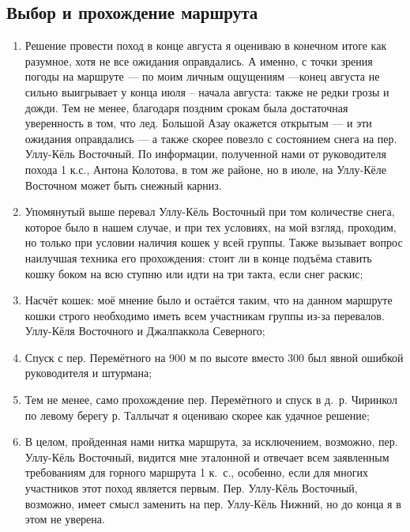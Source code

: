 \subsection{Выбор и прохождение маршрута}  
	\begin{enumerate}
		\item Решение провести поход в конце августа я оцениваю в конечном итоге как разумное, хотя не все ожидания оправдались. А именно, с точки зрения погоды на маршруте --- по моим личным ощущениям ---конец августа не сильно выигрывает у конца июля -- начала августа: также не редки грозы и дожди. Тем не менее, благодаря поздним срокам была достаточная уверенность в том, что лед. Большой Азау окажется открытым --- и эти ожидания оправдались --- а также скорее повезло с состоянием снега на пер. Уллу-Кёль Восточный. По информации, полученной нами от руководителя похода 1 к.с., Антона Колотова, в том же районе, но в июле, на Уллу-Кёле Восточном может быть снежный карниз.
		\item Упомянутый выше перевал Уллу-Кёль Восточный при том количестве снега, которое было в нашем случае, и при тех условиях, на мой взгляд, проходим, но только при условии наличия кошек у всей группы. Также вызывает вопрос наилучшая техника его прохождения: стоит ли в конце подъёма ставить кошку боком на всю ступню или идти на три такта, если снег раскис; 
		\item Насчёт кошек: моё мнение было и остаётся таким, что на данном маршруте кошки строго необходимо иметь всем участникам группы из-за перевалов. Уллу-Кёля Восточного и Джалпаккола Северного; 
		\item Спуск с пер. Перемётного на 900 м по высоте вместо 300 был явной ошибкой руководителя и штурмана; 
		\item Тем не менее, само прохождение пер. Перемётного и спуск в д.~р. Чиринкол по левому берегу р. Таллычат я оцениваю скорее как удачное решение; 
		\item В целом, пройденная нами нитка маршрута, за исключением, возможно, пер. Уллу-Кёль Восточный, видится мне эталонной и отвечает всем заявленным требованиям для горного маршрута 1 к.~с., особенно, если для многих участников этот поход является первым. Пер. Уллу-Кёль Восточный, возможно, имеет смысл заменить на пер. Уллу-Кёль Нижний, но до конца я в этом не уверена. 
	\end{enumerate}